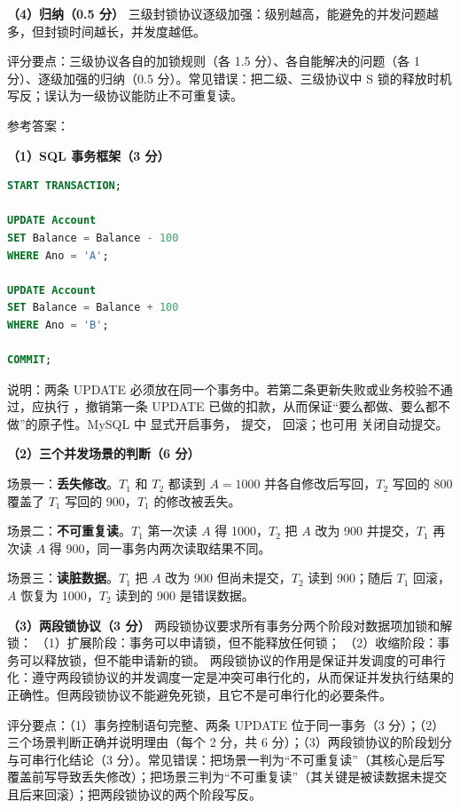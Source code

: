 \documentclass[a4paper,11pt]{article}
\begin{document}
\textbf{（4）归纳（0.5 分）}
三级封锁协议逐级加强：级别越高，能避免的并发问题越多，但封锁时间越长，并发度越低。
\begin{analysis}评分要点：三级协议各自的加锁规则（各 1.5 分）、各自能解决的问题（各 1 分）、逐级加强的归纳（0.5 分）。常见错误：把二级、三级协议中 S 锁的释放时机写反；误认为一级协议能防止不可重复读。\end{analysis}


\q 参考答案：

\textbf{（1）SQL 事务框架（3 分）}
\begin{lstlisting}[language=SQL]
START TRANSACTION;

UPDATE Account
SET Balance = Balance - 100
WHERE Ano = 'A';

UPDATE Account
SET Balance = Balance + 100
WHERE Ano = 'B';

COMMIT;
\end{lstlisting}
说明：两条 UPDATE 必须放在同一个事务中。若第二条更新失败或业务校验不通过，应执行 ，撤销第一条 UPDATE 已做的扣款，从而保证“要么都做、要么都不做”的原子性。MySQL 中  显式开启事务， 提交， 回滚；也可用  关闭自动提交。

\textbf{（2）三个并发场景的判断（6 分）}

场景一：\textbf{丢失修改}。$T_1$ 和 $T_2$ 都读到 $A=1000$ 并各自修改后写回，$T_2$ 写回的 800 覆盖了 $T_1$ 写回的 900，$T_1$ 的修改被丢失。

场景二：\textbf{不可重复读}。$T_1$ 第一次读 $A$ 得 1000，$T_2$ 把 $A$ 改为 900 并提交，$T_1$ 再次读 $A$ 得 900，同一事务内两次读取结果不同。

场景三：\textbf{读脏数据}。$T_1$ 把 $A$ 改为 900 但尚未提交，$T_2$ 读到 900；随后 $T_1$ 回滚，$A$ 恢复为 1000，$T_2$ 读到的 900 是错误数据。

\textbf{（3）两段锁协议（3 分）}
两段锁协议要求所有事务分两个阶段对数据项加锁和解锁：
（1）扩展阶段：事务可以申请锁，但不能释放任何锁；
（2）收缩阶段：事务可以释放锁，但不能申请新的锁。
两段锁协议的作用是保证并发调度的可串行化：遵守两段锁协议的并发调度一定是冲突可串行化的，从而保证并发执行结果的正确性。但两段锁协议不能避免死锁，且它不是可串行化的必要条件。
\begin{analysis}评分要点：（1）事务控制语句完整、两条 UPDATE 位于同一事务（3 分）；（2）三个场景判断正确并说明理由（每个 2 分，共 6 分）；（3）两段锁协议的阶段划分与可串行化结论（3 分）。常见错误：把场景一判为“不可重复读”（其核心是后写覆盖前写导致丢失修改）；把场景三判为“不可重复读”（其关键是被读数据未提交且后来回滚）；把两段锁协议的两个阶段写反。\end{analysis}
\end{document}
